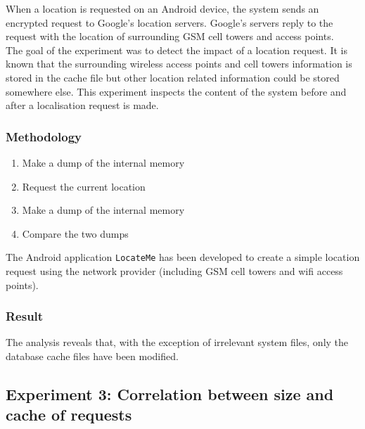 When a location is requested on an Android device, the system sends an encrypted request to Google's location servers.
Google's servers reply to the request with the location of surrounding GSM cell towers and access points.\\

The goal of the experiment was to detect the impact of a location request.
It is known that the surrounding wireless access points and cell towers information is stored in the cache file but other location related information could be stored somewhere else.
This experiment inspects the content of the system before and after a localisation request is made.


\subsubsection{Methodology}

\begin{enumerate}
\item Make a dump of the internal memory
\item Request the current location
\item Make a dump of the internal memory
\item Compare the two dumps
\end{enumerate}

The Android application \texttt{LocateMe} has been developed to create a simple location request using the network provider (including GSM cell towers and wifi access points).

\subsubsection{Result}

The analysis reveals that, with the exception of irrelevant system files, only the database cache files have been modified.\\

\subsection{Experiment 3: Correlation between size and cache of requests}

